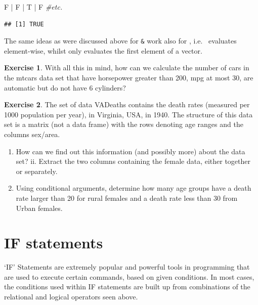 \documentclass[
]{book}
\newenvironment{Shaded}{\begin{snugshade}}{\end{snugshade}}
\newcommand{\CommentTok}[1]{\textcolor[rgb]{0.56,0.35,0.01}{\textit{#1}}}
\newcommand{\NormalTok}[1]{#1}
\newcommand{\SpecialCharTok}[1]{\textcolor[rgb]{0.00,0.00,0.00}{#1}}
\providecommand{\tightlist}{%
  \setlength{\itemsep}{0pt}\setlength{\parskip}{0pt}}
\theoremstyle{definition}
\theoremstyle{definition}
\theoremstyle{definition}
\newtheorem{exercise}{Exercise}[chapter]
\theoremstyle{definition}
\theoremstyle{remark}
\begin{document}
\begin{Shaded}
\begin{Highlighting}[]
\NormalTok{F }\SpecialCharTok{|}\NormalTok{ F }\SpecialCharTok{|}\NormalTok{ T }\SpecialCharTok{|}\NormalTok{ F }\CommentTok{\#etc.}
\end{Highlighting}
\end{Shaded}

\begin{verbatim}
## [1] TRUE
\end{verbatim}

The same ideas as were discussed above for \texttt{\&} work also for \texttt{\textbar{}}, i.e.~\texttt{\textbar{}} evaluates element-wise, whilst \texttt{\textbar{}\textbar{}} only evaluates the first element of a vector.

\begin{exercise}
With all this in mind, how can we calculate the number of cars in the mtcars data set that have horsepower greater than 200, mpg at most 30, are automatic but do not have 6 cylinders?
\end{exercise}

\begin{exercise}

The set of data VADeaths contains the death rates (measured per 1000 population per year), in Virginia, USA, in 1940. The structure of this data set is a matrix (not a data frame) with the rows denoting age ranges and the columns sex/area.

\begin{enumerate}
\def\labelenumi{\roman{enumi}.}
\tightlist
\item
  How can we find out this information (and possibly more) about the data set? ii. Extract the two columns containing the female data, either together or separately.
\item
  Using conditional arguments, determine how many age groups have a death rate larger than 20 for rural females and a death rate less than 30 from Urban females.
\end{enumerate}

\end{exercise}

\hypertarget{if-statements}{%
\section{IF statements}\label{if-statements}}

`IF' Statements are extremely popular and powerful tools in programming that are used to execute certain commands, based on given conditions. In most cases, the conditions used within IF statements are built up from combinations of the relational and logical operators seen above.
\end{document}
